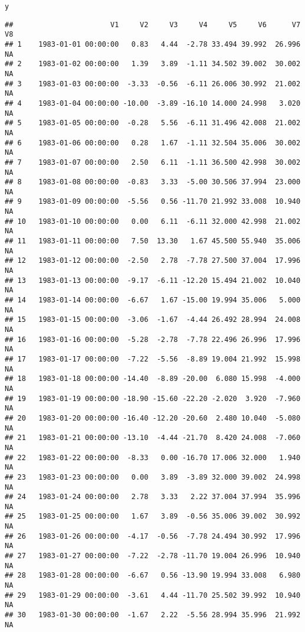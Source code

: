 \documentclass{article}\usepackage{graphicx, color}
\makeatletter
\newenvironment{kframe}{%
 \def\at@end@of@kframe{}%
 \ifinner\ifhmode%
  \def\at@end@of@kframe{\end{minipage}}%
  \begin{minipage}{\columnwidth}%
 \fi\fi%
 \def\FrameCommand##1{\hskip\@totalleftmargin \hskip-\fboxsep
 \colorbox{shadecolor}{##1}\hskip-\fboxsep
     \hskip-\linewidth \hskip-\@totalleftmargin \hskip\columnwidth}%
 \MakeFramed {\advance\hsize-\width
   \@totalleftmargin\z@ \linewidth\hsize
   \@setminipage}}%
 {\par\unskip\endMakeFramed%
 \at@end@of@kframe}
\newenvironment{knitrout}{}{} %
\makeatother
\begin{document}
\begin{knitrout}
\begin{kframe}
{\ttfamily\noindent\bfseries\color{errorcolor}{\#\# Error: could not find function "layer"}}\begin{alltt}
y
\end{alltt}
\begin{verbatim}
##                       V1     V2     V3     V4     V5     V6      V7     V8
## 1    1983-01-01 00:00:00   0.83   4.44  -2.78 33.494 39.992  26.996     NA
## 2    1983-01-02 00:00:00   1.39   3.89  -1.11 34.502 39.002  30.002     NA
## 3    1983-01-03 00:00:00  -3.33  -0.56  -6.11 26.006 30.992  21.002     NA
## 4    1983-01-04 00:00:00 -10.00  -3.89 -16.10 14.000 24.998   3.020     NA
## 5    1983-01-05 00:00:00  -0.28   5.56  -6.11 31.496 42.008  21.002     NA
## 6    1983-01-06 00:00:00   0.28   1.67  -1.11 32.504 35.006  30.002     NA
## 7    1983-01-07 00:00:00   2.50   6.11  -1.11 36.500 42.998  30.002     NA
## 8    1983-01-08 00:00:00  -0.83   3.33  -5.00 30.506 37.994  23.000     NA
## 9    1983-01-09 00:00:00  -5.56   0.56 -11.70 21.992 33.008  10.940     NA
## 10   1983-01-10 00:00:00   0.00   6.11  -6.11 32.000 42.998  21.002     NA
## 11   1983-01-11 00:00:00   7.50  13.30   1.67 45.500 55.940  35.006     NA
## 12   1983-01-12 00:00:00  -2.50   2.78  -7.78 27.500 37.004  17.996     NA
## 13   1983-01-13 00:00:00  -9.17  -6.11 -12.20 15.494 21.002  10.040     NA
## 14   1983-01-14 00:00:00  -6.67   1.67 -15.00 19.994 35.006   5.000     NA
## 15   1983-01-15 00:00:00  -3.06  -1.67  -4.44 26.492 28.994  24.008     NA
## 16   1983-01-16 00:00:00  -5.28  -2.78  -7.78 22.496 26.996  17.996     NA
## 17   1983-01-17 00:00:00  -7.22  -5.56  -8.89 19.004 21.992  15.998     NA
## 18   1983-01-18 00:00:00 -14.40  -8.89 -20.00  6.080 15.998  -4.000     NA
## 19   1983-01-19 00:00:00 -18.90 -15.60 -22.20 -2.020  3.920  -7.960     NA
## 20   1983-01-20 00:00:00 -16.40 -12.20 -20.60  2.480 10.040  -5.080     NA
## 21   1983-01-21 00:00:00 -13.10  -4.44 -21.70  8.420 24.008  -7.060     NA
## 22   1983-01-22 00:00:00  -8.33   0.00 -16.70 17.006 32.000   1.940     NA
## 23   1983-01-23 00:00:00   0.00   3.89  -3.89 32.000 39.002  24.998     NA
## 24   1983-01-24 00:00:00   2.78   3.33   2.22 37.004 37.994  35.996     NA
## 25   1983-01-25 00:00:00   1.67   3.89  -0.56 35.006 39.002  30.992     NA
## 26   1983-01-26 00:00:00  -4.17  -0.56  -7.78 24.494 30.992  17.996     NA
## 27   1983-01-27 00:00:00  -7.22  -2.78 -11.70 19.004 26.996  10.940     NA
## 28   1983-01-28 00:00:00  -6.67   0.56 -13.90 19.994 33.008   6.980     NA
## 29   1983-01-29 00:00:00  -3.61   4.44 -11.70 25.502 39.992  10.940     NA
## 30   1983-01-30 00:00:00  -1.67   2.22  -5.56 28.994 35.996  21.992     NA

\end{verbatim}
\end{kframe}
\end{knitrout}
\end{document}
